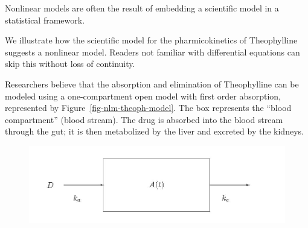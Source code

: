 \documentclass[
  letterpaper,
  DIV=11,
  numbers=noendperiod]{scrreprt}
\theoremstyle{definition}
\theoremstyle{definition}
\theoremstyle{remark}
\begin{document}
\begin{tcolorbox}[enhanced jigsaw, left=2mm, toprule=.15mm, arc=.35mm, breakable, opacitybacktitle=0.6, opacityback=0, rightrule=.15mm, colbacktitle=quarto-callout-tip-color!10!white, coltitle=black, leftrule=.75mm, toptitle=1mm, colframe=quarto-callout-tip-color-frame, titlerule=0mm, title=\textcolor{quarto-callout-tip-color}{\faLightbulb}\hspace{0.5em}{Big Idea}, bottomrule=.15mm, colback=white, bottomtitle=1mm]

Nonlinear models are often the result of embedding a scientific model in
a statistical framework.

\end{tcolorbox}

\begin{tcolorbox}[enhanced jigsaw, left=2mm, toprule=.15mm, arc=.35mm, breakable, opacitybacktitle=0.6, opacityback=0, rightrule=.15mm, colbacktitle=quarto-callout-note-color!10!white, coltitle=black, leftrule=.75mm, toptitle=1mm, colframe=quarto-callout-note-color-frame, titlerule=0mm, title=\textcolor{quarto-callout-note-color}{\faInfo}\hspace{0.5em}{Scientific Model for Theophylline}, bottomrule=.15mm, colback=white, bottomtitle=1mm]

We illustrate how the scientific model for the pharmicokinetics of
Theophylline suggests a nonlinear model. Readers not familiar with
differential equations can skip this without loss of continuity.

Researchers believe that the absorption and elimination of Theophylline
can be modeled using a one-compartment open model with first order
absorption, represented by Figure~\ref{fig-nlm-theoph-model}. The box
represents the ``blood compartment'' (blood stream). The drug is
absorbed into the blood stream through the gut; it is then metabolized
by the liver and excreted by the kidneys.

\begin{figure}[H]

{\centering \includegraphics{./images/Theophylline-Model.jpg}

}
\end{figure}
\end{tcolorbox}
\end{document}
